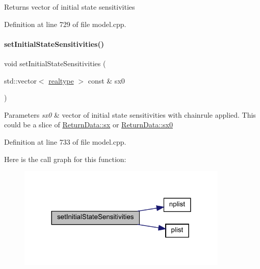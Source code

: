 \begin{DoxyReturn}{Returns}
vector of initial state sensitivities 
\end{DoxyReturn}


Definition at line 729 of file model.\+cpp.

\mbox{\label{classamici_1_1_model_a82941b121d9db31d357642092a2cd41d}} 
\paragraph{\texorpdfstring{setInitialStateSensitivities()}{setInitialStateSensitivities()}}
{\footnotesize\ttfamily void set\+Initial\+State\+Sensitivities (\begin{DoxyParamCaption}\item[{std\+::vector$<$ \mbox{\hyperlink{namespaceamici_a1bdce28051d6a53868f7ccbf5f2c14a3}{realtype}} $>$ const \&}]{sx0 }\end{DoxyParamCaption})}


\begin{DoxyParams}{Parameters}
{\em sx0} & vector of initial state sensitivities with chainrule applied. This could be a slice of \mbox{\hyperlink{classamici_1_1_return_data_ac3288cc7f649605938f1fd1b459d3d8c}{Return\+Data\+::sx}} or \mbox{\hyperlink{classamici_1_1_return_data_a83cf74df5a7fee8ee66f882b898e7b63}{Return\+Data\+::sx0}} \\
\hline
\end{DoxyParams}


Definition at line 733 of file model.\+cpp.

Here is the call graph for this function\+:
\nopagebreak
\begin{figure}[H]
\begin{center}
\leavevmode
\includegraphics[width=284pt]{classamici_1_1_model_a82941b121d9db31d357642092a2cd41d_cgraph}
\end{center}
\end{figure}
\mbox{\label{classamici_1_1_model_a55c3dcaac3e24e7b6ec3a80c7f148ed6}} 
